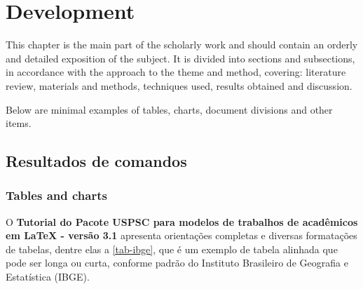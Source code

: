 

\chapter{Development}\label{ch_development}
This chapter is the main part of the scholarly work and should contain an orderly and detailed exposition of the subject. It is divided into sections and subsections, in accordance with the approach to the theme and method, covering: literature review, materials and methods, techniques used, results obtained and discussion.

Below are minimal examples of tables, charts, document divisions and other items.

\section{Resultados de comandos}\label{sec-divisoes}

\subsection{Tables and charts}

O \textbf{Tutorial do Pacote USPSC para modelos de trabalhos de acad\^emicos em LaTeX - vers\~ao 3.1} apresenta orientações completas e diversas formatações de tabelas, dentre elas a \autoref{tab-ibge}, que é um exemplo de tabela alinhada que pode ser longa ou curta, conforme padrão do Instituto Brasileiro de Geografia e Estatística (IBGE).

\begin{table}[htb]
\end{table}


